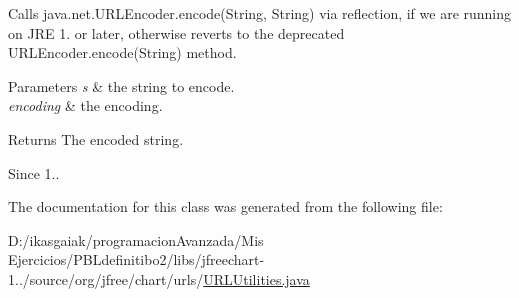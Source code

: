 Calls {\ttfamily java.\+net.\+U\+R\+L\+Encoder.\+encode(\+String, String)} via reflection, if we are running on J\+RE 1. or later, otherwise reverts to the deprecated {\ttfamily U\+R\+L\+Encoder.\+encode(\+String)} method.


\begin{DoxyParams}{Parameters}
{\em s} & the string to encode. \\
\hline
{\em encoding} & the encoding.\\
\hline
\end{DoxyParams}
\begin{DoxyReturn}{Returns}
The encoded string.
\end{DoxyReturn}
\begin{DoxySince}{Since}
1.. 
\end{DoxySince}


The documentation for this class was generated from the following file\+:\begin{DoxyCompactItemize}
\item 
D\+:/ikasgaiak/programacion\+Avanzada/\+Mis Ejercicios/\+P\+B\+Ldefinitibo2/libs/jfreechart-\/1../source/org/jfree/chart/urls/\mbox{\hyperlink{_u_r_l_utilities_8java}{U\+R\+L\+Utilities.\+java}}\end{DoxyCompactItemize}
